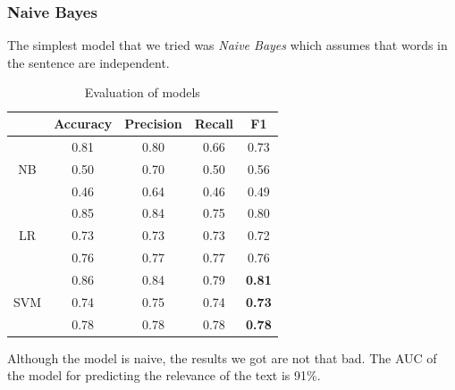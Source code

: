 \documentclass[11pt,a4paper]{article}
\begin{document}
\subsubsection{Naive Bayes}
The simplest model that we tried was \textit{Naive Bayes} which assumes that words in the sentence are independent.



\begin{table}[h]
    \centering
    \begin{tabular}{c | c c c c}
         & Accuracy & Precision & Recall & F1 \\ 
    \hline
    \multirow{3}{*}{NB} & 0.81 & 0.80 & 0.66 & 0.73 \\
                & 0.50 & 0.70 & 0.50 & 0.56 \\
                & 0.46 & 0.64 & 0.46 & 0.49 \\
    \hline
    \multirow{3}{*}{LR} & 0.85 & 0.84 & 0.75 & 0.80 \\
                & 0.73 & 0.73 & 0.73 & 0.72 \\
                & 0.76 & 0.77 & 0.77 & 0.76 \\
    \hline
    \multirow{3}{*}{SVM} & 0.86 & 0.84 & 0.79 & \textbf{0.81} \\
                & 0.74 & 0.75 & 0.74 & \textbf{0.73} \\
                & 0.78 & 0.78 & 0.78 & \textbf{0.78} \\
    
    \end{tabular}
    \caption{Evaluation of models}
    \label{tab:tab1}
\end{table}



Although the model is naive, the results we got are not that bad.
The AUC of the model for predicting the relevance of the text is 91\%.
\end{document}
